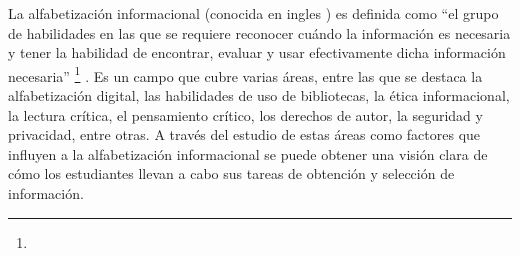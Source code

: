 


La alfabetización informacional (conocida en ingles ) es definida como “el grupo de habilidades en las que se requiere reconocer cuándo la información es necesaria y tener la habilidad de encontrar, evaluar y usar efectivamente dicha información necesaria” \footnote{\traduccionlibre} \parencite[p.~2]{american2000information}. Es un campo que cubre varias áreas, entre las que se destaca la alfabetización digital, las habilidades de uso de bibliotecas, la ética informacional, la lectura crítica, el pensamiento crítico, los derechos de autor, la seguridad y privacidad, entre otras. A través del estudio de estas áreas como factores que influyen a la alfabetización informacional se puede obtener una visión clara de cómo los estudiantes llevan a cabo sus tareas de obtención y selección de información.


